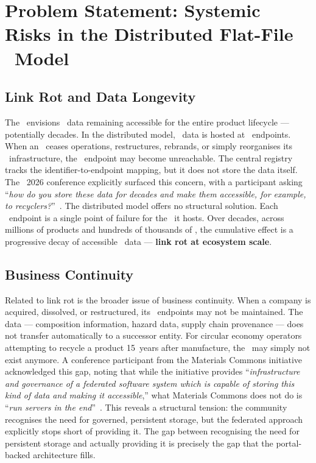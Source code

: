 \section{Problem Statement: Systemic Risks in the Distributed Flat-File \DPP\
Model}

\subsection{Link Rot and Data Longevity}

The \ESPR\ envisions \DPP\ data remaining accessible for the entire product
lifecycle --- potentially decades. In the distributed model, \DPP\ data is
hosted at \REO\ endpoints. When an \REO\ ceases operations, restructures,
rebrands, or simply reorganises its \IT\ infrastructure, the \DPP\ endpoint may
become unreachable. The central registry tracks the identifier-to-endpoint
mapping, but it does not store the data itself. The \DPPforEU~2026 conference
explicitly surfaced this concern, with a participant asking ``\textit{how do you
store these data for decades and make them accessible, for example, to
recyclers?}''~\cite{conf_persistency}. The distributed model offers no
structural solution. Each \REO\ endpoint is a single point of failure for the
\DPPs\ it hosts. Over decades, across millions of products and hundreds of
thousands of \REOs, the cumulative effect is a progressive decay of accessible
\DPP\ data --- \textbf{link rot at ecosystem scale}.

\subsection{Business Continuity}

Related to link rot is the broader issue of business continuity. When a company
is acquired, dissolved, or restructured, its \DPP\ endpoints may not be
maintained. The data --- composition information, hazard data, supply chain
provenance --- does not transfer automatically to a successor entity. For
circular economy operators attempting to recycle a product 15~years after
manufacture, the \DPP\ may simply not exist anymore. A conference participant
from the Materials Commons initiative acknowledged this gap, noting that while
the initiative provides ``\textit{infrastructure and governance of a federated
software system which is capable of storing this kind of data and making it
accessible},'' what Materials Commons does not do is ``\textit{run servers in
the end}''~\cite{conf_materials_commons}. This reveals a structural tension: the
community recognises the need for governed, persistent storage, but the
federated approach explicitly stops short of providing it. The gap between
recognising the need for persistent storage and actually providing it is
precisely the gap that the portal-backed architecture fills.


